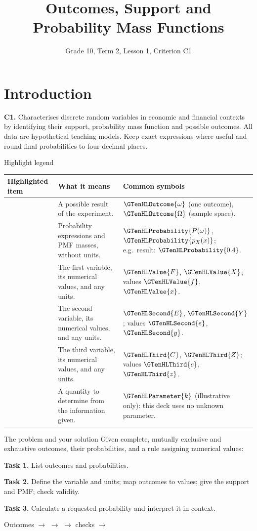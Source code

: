 \documentclass[12pt,aspectratio=169]{beamer}
\title{Outcomes, Support and Probability Mass Functions}
\subtitle{Grade 10, Term 2, Lesson 1, Criterion C1}
\author{}
\date{}
\makeatletter
\renewcommand{\arraystretch}{1.22}
\newcommand{\LessonHighlightLegend}{%
  \begingroup
  \small
  \setlength{\tabcolsep}{4pt}
  \renewcommand{\arraystretch}{1.0}
  \begin{tabularx}{\linewidth}{@{}>{\raggedright\arraybackslash}p{.255\linewidth}%
    >{\raggedright\arraybackslash}X>{\raggedright\arraybackslash}p{.34\linewidth}@{}}
    \toprule
    \textbf{Highlighted item} & \textbf{What it means} & \textbf{Common symbols} \\
    \midrule
    \GTenHLOutcome{Outcome} & A possible result of the experiment. &
      $\GTenHLOutcome{\omega}$ (one outcome),\newline
      $\GTenHLOutcome{\Omega}$ (sample space). \\
    \GTenHLProbability{Probability} & Probability expressions and PMF masses, without units. &
      $\GTenHLProbability{P(\omega)}$, $\GTenHLProbability{p_X(x)}$;\newline
      e.g.\ result: $\GTenHLProbability{0.4}$. \\
    \GTenHLValue{First variable} & The first variable, its numerical values, and any units. &
      $\GTenHLValue{F}$, $\GTenHLValue{X}$; values $\GTenHLValue{f}$, $\GTenHLValue{x}$. \\
    \GTenHLSecond{Second variable} & The second variable, its numerical values, and any units. &
      $\GTenHLSecond{E}$, $\GTenHLSecond{Y}$; values $\GTenHLSecond{e}$, $\GTenHLSecond{y}$. \\
    \GTenHLThird{Third variable} & The third variable, its numerical values, and any units. &
      $\GTenHLThird{C}$, $\GTenHLThird{Z}$; values $\GTenHLThird{c}$, $\GTenHLThird{z}$. \\
    \GTenHLParameter{Unknown parameter} & A quantity to determine from the information given. &
      $\GTenHLParameter{k}$ (illustrative only): this deck uses no unknown parameter. \\
    \bottomrule
  \end{tabularx}\par
  \endgroup
}
\makeatother
\begin{document}
\section{Introduction}

\begin{frame}
  \vfill
  {\color{LessonTeal}\bfseries\insertsubtitle\par}
  \medskip
  {\huge\bfseries\inserttitle\par}
  \bigskip
  \textbf{C1.} Characterises discrete random variables in economic and
  financial contexts by identifying their support, probability mass function
  and possible outcomes.
  \vfill
  All data are hypothetical teaching models. Keep exact expressions where
  useful and round final probabilities to four decimal places.
  \vfill
\end{frame}

\begin{frame}[t]{Highlight legend}
  \LessonHighlightLegend
\end{frame}

\begin{frame}[t]{The problem and your solution}
  Given complete, mutually exclusive and exhaustive outcomes, their
  probabilities, and a rule assigning numerical values:

  \medskip
  \textbf{Task 1.} List outcomes and probabilities.\par
  \medskip
  \textbf{Task 2.} Define the variable and units; map outcomes to values;
  give the support and PMF; check validity.\par
  \medskip
  \textbf{Task 3.} Calculate a requested probability and interpret it in context.

  \bigskip
  \begin{center}
    Outcomes $\to$  $\to$
     $\to$ checks $\to$
  \end{center}
\end{frame}
\end{document}

